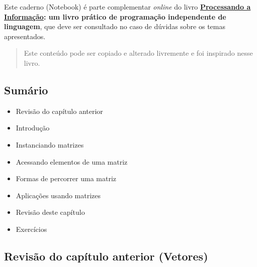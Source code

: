 \documentclass[12pt,a4paper]{article}
\providecommand{\tightlist}{%
      \setlength{\itemsep}{0pt}\setlength{\parskip}{0pt}}
\begin{document}
Este caderno (Notebook) é parte complementar \emph{online} do livro
\textbf{\href{https://editora.ufabc.edu.br/matematica-e-ciencias-da-computacao/58-processando-a-informacao}{Processando
a Informação}: um livro prático de programação independente de
linguagem}, que deve ser consultado no caso de dúvidas sobre os temas
apresentados.

\begin{quote}
Este conteúdo pode ser copiado e alterado livremente e foi inspirado
nesse livro.
\end{quote}

    \hypertarget{sumuxe1rio}{%
\subsection{Sumário}\label{sumuxe1rio}}

\begin{itemize}
\tightlist
\item
  Revisão do capítulo anterior
\item
  Introdução
\item
  Instanciando matrizes
\item
  Acessando elementos de uma matriz
\item
  Formas de percorrer uma matriz
\item
  Aplicações usando matrizes
\item
  Revisão deste capítulo
\item
  Exercícios
\end{itemize}

    \hypertarget{revisuxe3o-do-capuxedtulo-anterior-vetores}{%
\subsection{Revisão do capítulo anterior
(Vetores)}\label{revisuxe3o-do-capuxedtulo-anterior-vetores}}
\end{document}
